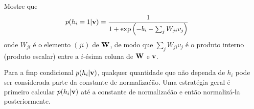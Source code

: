 \begin{exenumerate}
    \item Mostre que
    \begin{equation}
        p(h_i = 1 | \mathbf{v}) = \frac{1}{1+\exp\left(-b_i-\sum_j W_{ji} v_j\right)}
        \label{eq:hcondv-corrected}
    \end{equation}
    onde $W_{ji}$ \'e o elemento $(ji)$ de $\mathbf{W}$, de modo que $\sum_j W_{ji} v_j$ \'e o produto interno (produto escalar) entre a $i$-\'esima coluna de $\mathbf{W}$ e $\mathbf{v}$.
    \begin{solution}
        
        Para a fmp condicional $p(h_i | \mathbf{v})$, qualquer quantidade que n\~ao
        dependa de $h_i$ pode ser considerada parte da constante de normaliza\'c\~ao. Uma estrat\'egia geral \'e primeiro calcular $p(h_i | \mathbf{v})$ at\'e a constante de normaliza\'c\~ao e ent\~ao normaliz\'a-la posteriormente.
        

\end{solution}
\end{exenumerate}
